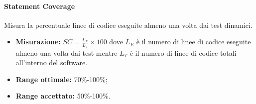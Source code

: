 			\paragraph{Statement Coverage}
			Misura la percentuale linee di codice eseguite almeno una volta dai test dinamici.
				\begin{itemize}
				\item \textbf{Misurazione:} $SC=\frac{L_E}{L_T}\times 100$ dove $L_E$ è il numero di linee di codice eseguite almeno una volta dai test mentre $L_T$ è il numero di linee di codice totali all'interno del software.
				\item \textbf{Range ottimale:} 70\%-100\%;
				\item \textbf{Range accettato:} 50\%-100\%.
		    	\end{itemize}
